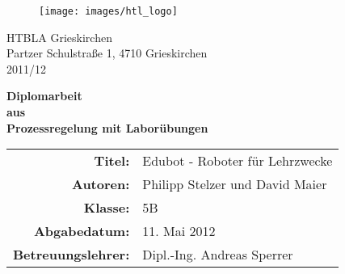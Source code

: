 
\begin{titlepage}

	\begin{figure}[H]
	\hspace{10cm}
		\texttt{[image: images/htl\_logo]}
	\end{figure}
	\vspace*{3cm}
	
	\begin{center}
		\Huge
		HTBLA Grieskirchen\\
		\vspace{0.5cm}
		\large
		Partzer Schulstraße 1, 4710 Grieskirchen\\
		\vspace{1.5cm}
		\Large
		2011/12\\		
		
		\vspace{1.5cm}	
			
		
		\Huge
		\textbf{Diplomarbeit}\\
		\vspace{1em}
		\textbf{aus}\\
		\vspace{1em}
		\textbf{Prozessregelung mit Laborübungen}\\
		\vspace{3cm}
		\normalsize
	\end{center}
	
	\hspace{2.85cm}
	\begin{tabular}{rl}
		\textbf{Titel:}   & Edubot - Roboter für Lehrzwecke\\
		\textbf{Autoren:}   & Philipp Stelzer und David Maier\\
		\textbf{Klasse:}   & 5B\\
		\textbf{Abgabedatum:}   & 11. Mai 2012\\
		\textbf{Betreuungslehrer:}   & Dipl.-Ing. Andreas Sperrer\\
	\end{tabular}
	
	\normalsize
\end{titlepage}

%
%
